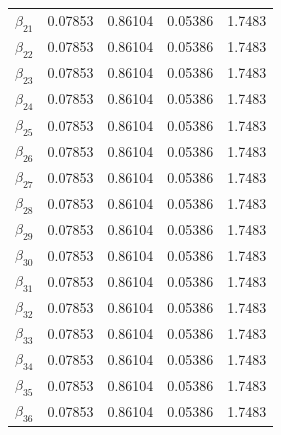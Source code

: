 \begin{table} [H]
\begin{tabularx}{\textwidth}{l|XXXX}
		$\beta_{21}$ & 0.07853 & 0.86104 & 0.05386 & 1.7483\\
		$\beta_{22}$ & 0.07853 & 0.86104 & 0.05386 & 1.7483\\
		$\beta_{23}$ & 0.07853 & 0.86104 & 0.05386 & 1.7483\\
		$\beta_{24}$ & 0.07853 & 0.86104 & 0.05386 & 1.7483\\
		$\beta_{25}$ & 0.07853 & 0.86104 & 0.05386 & 1.7483\\
		$\beta_{26}$ & 0.07853 & 0.86104 & 0.05386 & 1.7483\\
		$\beta_{27}$ & 0.07853 & 0.86104 & 0.05386 & 1.7483\\
		$\beta_{28}$ & 0.07853 & 0.86104 & 0.05386 & 1.7483\\
		$\beta_{29}$ & 0.07853 & 0.86104 & 0.05386 & 1.7483\\
		$\beta_{30}$ & 0.07853 & 0.86104 & 0.05386 & 1.7483\\
		$\beta_{31}$ & 0.07853 & 0.86104 & 0.05386 & 1.7483\\
		$\beta_{32}$ & 0.07853 & 0.86104 & 0.05386 & 1.7483\\
		$\beta_{33}$ & 0.07853 & 0.86104 & 0.05386 & 1.7483\\
		$\beta_{34}$ & 0.07853 & 0.86104 & 0.05386 & 1.7483\\
		$\beta_{35}$ & 0.07853 & 0.86104 & 0.05386 & 1.7483\\
		$\beta_{36}$ & 0.07853 & 0.86104 & 0.05386 & 1.7483\\ \hline
	\end{tabularx}
\end{table}